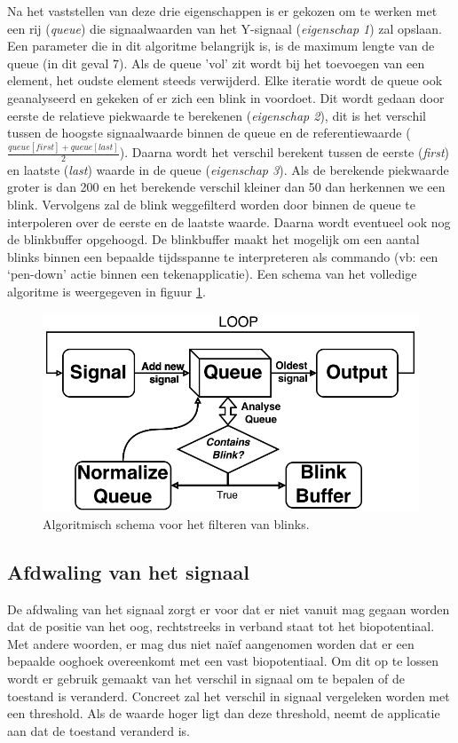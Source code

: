 \documentclass{article}
\newcommand{\figwidth}{0.82\linewidth}
\begin{document}
Na het vaststellen van deze drie eigenschappen is er gekozen om te werken met een rij (\textit{queue}) die signaalwaarden van het Y-signaal (\textit{eigenschap 1}) zal opslaan. Een parameter die in dit algoritme belangrijk is, is de maximum lengte van de queue (in dit geval 7). Als de queue 'vol' zit wordt bij het toevoegen van een element, het oudste element steeds verwijderd. Elke iteratie wordt de queue ook geanalyseerd en gekeken of er zich een blink in voordoet. Dit wordt gedaan door eerste de relatieve piekwaarde te berekenen (\textit{eigenschap 2}), dit is het verschil tussen de hoogste signaalwaarde binnen de queue en de referentiewaarde ($\frac{queue[first] + queue[last]}{2}$). Daarna wordt het verschil berekent tussen de eerste (\textit{first}) en laatste (\textit{last}) waarde in de queue (\textit{eigenschap 3}). Als de berekende piekwaarde groter is
dan 200 en het berekende verschil kleiner dan 50 dan herkennen we een blink. Vervolgens zal de blink weggefilterd worden door binnen de queue te interpoleren over de eerste en de laatste waarde. Daarna wordt eventueel ook nog de blinkbuffer opgehoogd. De blinkbuffer maakt het mogelijk om een aantal blinks binnen een bepaalde tijdsspanne te interpreteren als commando (vb: een ‘pen-down’ actie binnen een tekenapplicatie). Een schema van het volledige algoritme is weergegeven in figuur \ref{fig:algoblinkfilter}.

\begin{figure}[H]
	\centering
	\includegraphics[width = \figwidth]{images/blinkfilterbw}
	\caption{Algoritmisch schema voor het filteren van blinks.}
	\label{fig:algoblinkfilter}
\end{figure}
\subsection{Afdwaling van het signaal}
De afdwaling van het signaal zorgt er voor dat er niet vanuit mag gegaan worden dat de positie van het oog, rechtstreeks in verband staat tot het biopotentiaal. Met andere woorden, er mag dus niet na\"ief aangenomen worden dat er een bepaalde ooghoek overeenkomt met een vast biopotentiaal. Om dit op te lossen wordt er gebruik gemaakt van het verschil in signaal om te bepalen of de toestand is veranderd. Concreet zal het verschil in signaal vergeleken worden met een threshold. Als de waarde hoger ligt dan deze threshold, neemt de applicatie aan dat de toestand veranderd is.\\
\end{document}
